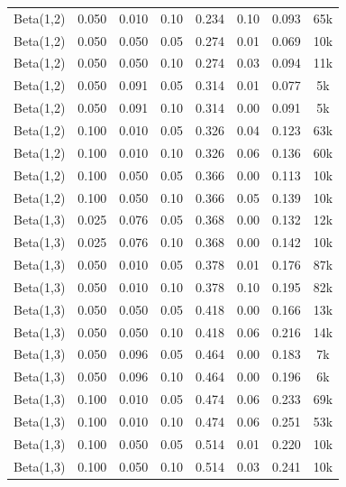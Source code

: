 \begin{table}
\begin{center}
\begin{small}
\begin{sc}
\begin{tabular}{lccc|cccc}
Beta(1,2) & 0.050 & 0.010 & 0.10 & 0.234 & 0.10 & 0.093 & 65k \\
Beta(1,2) & 0.050 & 0.050 & 0.05 & 0.274 & 0.01 & 0.069 & 10k \\
Beta(1,2) & 0.050 & 0.050 & 0.10 & 0.274 & 0.03 & 0.094 & 11k \\
Beta(1,2) & 0.050 & 0.091 & 0.05 & 0.314 & 0.01 & 0.077 & 5k \\
Beta(1,2) & 0.050 & 0.091 & 0.10 & 0.314 & 0.00 & 0.091 & 5k \\
Beta(1,2) & 0.100 & 0.010 & 0.05 & 0.326 & 0.04 & 0.123 & 63k \\
Beta(1,2) & 0.100 & 0.010 & 0.10 & 0.326 & 0.06 & 0.136 & 60k \\
Beta(1,2) & 0.100 & 0.050 & 0.05 & 0.366 & 0.00 & 0.113 & 10k \\
Beta(1,2) & 0.100 & 0.050 & 0.10 & 0.366 & 0.05 & 0.139 & 10k \\
Beta(1,3) & 0.025 & 0.076 & 0.05 & 0.368 & 0.00 & 0.132 & 12k \\
Beta(1,3) & 0.025 & 0.076 & 0.10 & 0.368 & 0.00 & 0.142 & 10k \\
Beta(1,3) & 0.050 & 0.010 & 0.05 & 0.378 & 0.01 & 0.176 & 87k \\
Beta(1,3) & 0.050 & 0.010 & 0.10 & 0.378 & 0.10 & 0.195 & 82k \\
Beta(1,3) & 0.050 & 0.050 & 0.05 & 0.418 & 0.00 & 0.166 & 13k \\
Beta(1,3) & 0.050 & 0.050 & 0.10 & 0.418 & 0.06 & 0.216 & 14k \\
Beta(1,3) & 0.050 & 0.096 & 0.05 & 0.464 & 0.00 & 0.183 & 7k \\
Beta(1,3) & 0.050 & 0.096 & 0.10 & 0.464 & 0.00 & 0.196 & 6k \\
Beta(1,3) & 0.100 & 0.010 & 0.05 & 0.474 & 0.06 & 0.233 & 69k \\
Beta(1,3) & 0.100 & 0.010 & 0.10 & 0.474 & 0.06 & 0.251 & 53k \\
Beta(1,3) & 0.100 & 0.050 & 0.05 & 0.514 & 0.01 & 0.220 & 10k \\
Beta(1,3) & 0.100 & 0.050 & 0.10 & 0.514 & 0.03 & 0.241 & 10k \\
\hline
\end{tabular}
\end{sc}
\end{small}
\end{center}
\vskip -0.1in
\end{table}



